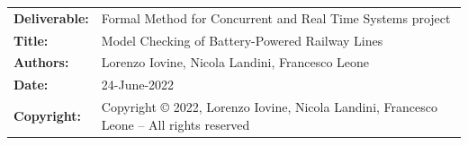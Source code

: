 
\begin{table}[h!]
    \begin{tabu} to \textwidth { X[0.3,r,p] X[0.7,l,p] }
    \hline

    \textbf{Deliverable:} & Formal Method for Concurrent and Real Time Systems project\\
    \textbf{Title:} & Model Checking of Battery-Powered Railway Lines \\
    \textbf{Authors:} & Lorenzo Iovine, Nicola Landini, Francesco Leone\\
    \textbf{Date:} & 24-June-2022 \\
    \textbf{Copyright:} & Copyright © 2022, Lorenzo Iovine, Nicola Landini, Francesco Leone – All rights reserved \\
    \hline
    \end{tabu}
\end{table}




\setcounter{page}{2}


\newpage
{}
\tableofcontents

\clearpage
{}
\label{sect:design}


\clearpage
{}
\label{sect:uppaal}


\clearpage
{}
\label{sect:result}


